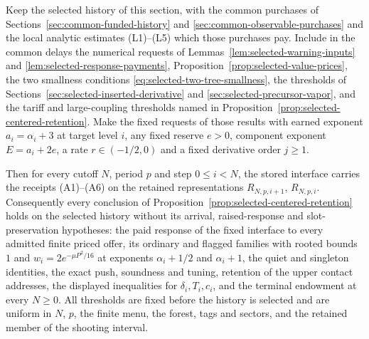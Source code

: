 \begin{theorem}
\label{thm:selected-retention-public}
Keep the selected history of this section, with the common purchases of
Sections~\ref{sec:common-funded-history} and
\ref{sec:common-observable-purchases} and the local analytic estimates
(L1)--(L5) which those purchases pay. Include in the common delays the
numerical requests of
Lemmas~\ref{lem:selected-warning-inputs} and
\ref{lem:selected-response-payments},
Proposition~\ref{prop:selected-value-prices},
the two smallness conditions \eqref{eq:selected-two-tree-smallness},
the thresholds of
Sections~\ref{sec:selected-inserted-derivative} and
\ref{sec:selected-precursor-vapor}, and the tariff and large-coupling thresholds
named in Proposition~\ref{prop:selected-centered-retention}. Make the
fixed requests of those results with earned exponent $a_i=\alpha_i+3$
at target level $i$, any fixed reserve $e>0$, component exponent
$E=a_i+2e$, a rate $r\in(-1/2,0)$ and a fixed derivative
order $j\ge1$.

Then for every cutoff $N$, period $p$ and step $0\le i<N$, the stored
interface carries the receipts (A1)--(A6) on the retained representations
$R_{N,p,i+1}$, $R_{N,p,i}$. Consequently every conclusion of
Proposition~\ref{prop:selected-centered-retention} holds on the selected
history without its arrival, raised-response and slot-preservation
hypotheses: the paid response of the fixed interface to every admitted
finite priced offer, its ordinary and flagged families with rooted
bounds $1$ and $w_i=2e^{-\mu P^2/16}$ at exponents $\alpha_i+1/2$ and
$\alpha_i+1$, the quiet and singleton identities, the exact push,
soundness and tuning, retention of the upper contact addresses, the
displayed inequalities for $\delta_i,T_i,c_i$, and the terminal
endowment at every $N\ge0$. All thresholds are fixed before the history
is selected and are uniform in $N$, $p$, the finite menu, the forest,
tags and sectors, and the retained member of the shooting interval.
\end{theorem}

